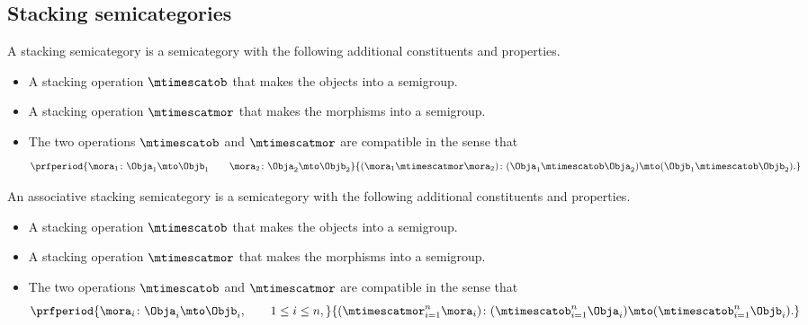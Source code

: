 \subsection{Stacking semicategories}

\begin{ctdefinition}
    \label{def:simple-stacking-semi-cat}
    A stacking semicategory is a semicategory with the following additional constituents and properties.

    \constit
    \begin{itemize}
        \item A stacking operation $\mtimescatob$ that makes the objects into a semigroup.
        \item A stacking operation $\mtimescatmor$ that makes the morphisms into a semigroup.
    \end{itemize}

    \condit
    \begin{itemize}
        \item The two operations $\mtimescatob$ and $\mtimescatmor$ are compatible in the sense that
              \begin{equation}
                  \prfperiod{
                      \mora_1 \colon \Obja_1 \mto \Objb_1
                      \qquad
                      \mora_2 \colon \Obja_2 \mto \Objb_2
                  }{
                      ( \mora_1 \mtimescatmor \mora_2 )\colon( \Obja_1 \mtimescatob  \Obja_2) \mto ( \Objb_1 \mtimescatob \Objb_2).
                  }
              \end{equation}
    \end{itemize}
\end{ctdefinition}

\begin{ctdefinition}
    \label{def:stacking-semi-cat}
    An associative stacking semicategory is a semicategory with the following additional constituents and properties.

    \constit
    \begin{itemize}
        \item A stacking operation $\mtimescatob$ that makes the objects into a semigroup.
        \item A stacking operation $\mtimescatmor$ that makes the morphisms into a semigroup.
    \end{itemize}

    \condit
    \begin{itemize}
        \item The two operations $\mtimescatob$ and $\mtimescatmor$ are compatible in the sense that
              \begin{equation}
                  \prfperiod{
                      \mora_i \colon \Obja_i \mto \Objb_i, \qquad 1 \leq i \leq n,
                  }{
                      ( \mtimescatmor_{i=1}^n \mora_i )\colon( \mtimescatob_{i=1}^n \Obja_i) \mto (\mtimescatob_{i=1}^n \Objb_i).
                  }
              \end{equation}
    \end{itemize}
\end{ctdefinition}

